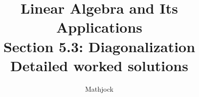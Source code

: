 
\title{\textbf{Linear Algebra and Its Applications}\\[0.3em]Section 5.3: Diagonalization\\[0.3em]\large Detailed worked solutions}
\author{Mathjock}
\date{}

\maketitle
\bookinfo
\tableofcontents
\clearpage
\renewcommand{\thesection}{5.\arabic{section}}
\renewcommand{\theHsection}{5.\arabic{section}}
\setcounter{section}{2}



